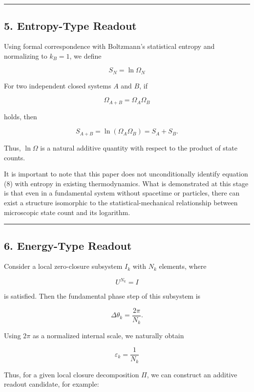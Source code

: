 \documentclass[
  a4paper,
]{article}
\begin{document}
\begin{center}\rule{0.5\linewidth}{0.5pt}\end{center}

\subsection{5. Entropy-Type Readout}\label{entropy-type-readout}

Using formal correspondence with Boltzmann's statistical entropy and
normalizing to \(k_B=1\), we define

\[
S_N=\ln\Omega_N
\tag{8}
\]

For two independent closed systems \(A\) and \(B\), if

\[
\Omega_{A+B}
=
\Omega_A\Omega_B
\]

holds, then

\[
S_{A+B}
=
\ln(\Omega_A\Omega_B)
=
S_A+S_B.
\tag{9}
\]

Thus, \(\ln\Omega\) is a natural additive quantity with respect to the
product of state counts.

It is important to note that this paper does not unconditionally
identify equation (8) with entropy in existing thermodynamics. What is
demonstrated at this stage is that even in a fundamental system without
spacetime or particles, there can exist a structure isomorphic to the
statistical-mechanical relationship between microscopic state count and
its logarithm.

\begin{center}\rule{0.5\linewidth}{0.5pt}\end{center}

\subsection{6. Energy-Type Readout}\label{energy-type-readout}

Consider a local zero-closure subsystem \(I_k\) with \(N_k\) elements,
where

\[
U^{N_k}=I
\]

is satisfied. Then the fundamental phase step of this subsystem is

\[
\Delta\theta_k
=
\frac{2\pi}{N_k}.
\tag{10}
\]

Using \(2\pi\) as a normalized internal scale, we naturally obtain

\[
\varepsilon_k
=
\frac{1}{N_k}
\tag{11}
\]

Thus, for a given local closure decomposition \(\Pi\), we can construct
an additive readout candidate, for example:
\end{document}

